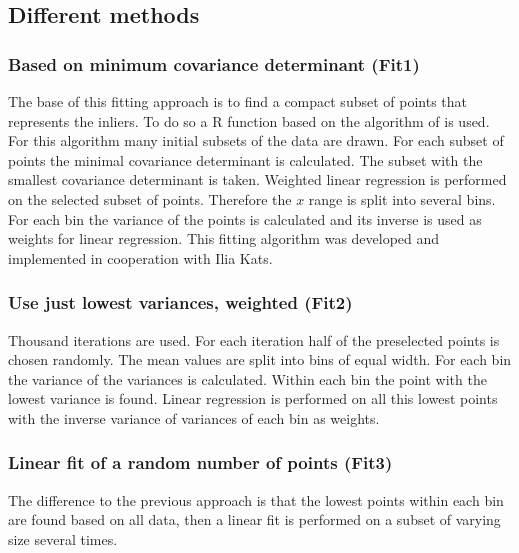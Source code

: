 \subsection{Different methods}
\subsubsection*{Based on minimum covariance determinant (Fit1)}
The base of this fitting approach is to find a compact subset of points that represents the inliers. To do so a R function based on the algorithm of \cite{ilia1} is used. For this algorithm many initial subsets of  the data are drawn. For each subset of points the minimal covariance determinant is calculated. The subset with the smallest covariance determinant is taken. Weighted linear regression is performed on the selected subset of points. Therefore the $x$ range is split into several bins. For each bin the variance of the points is calculated and its inverse is used as weights for linear regression.\newline
This fitting algorithm was developed and implemented in cooperation with Ilia Kats.
\subsubsection*{Use just lowest variances, weighted (Fit2)}
Thousand iterations are used. For each iteration half of the preselected points is chosen randomly. 
The mean values are split into bins of equal width. For each bin the variance of the variances is calculated. Within each bin the point with the lowest variance is found. Linear regression is performed on all this lowest points with the inverse variance of variances of each bin as weights. 
\subsubsection*{Linear fit of a random number of points (Fit3)}
The difference to the previous approach is that the lowest points within each bin are found based on all data, then a linear fit is performed on a subset of varying size several times.
